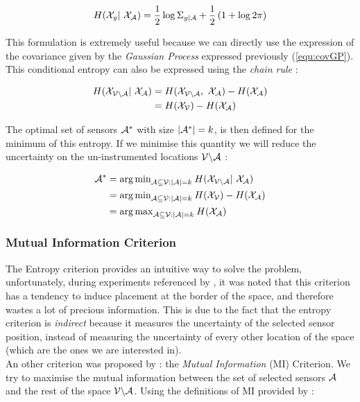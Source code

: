\documentclass[12pt,twoside]{report}
\begin{document}
\begin{equation}
	H(\X_{y} | \X_\A) = \frac{1}{2} \log \Sigma_{y | \A} + \frac{1}{2} \left(1 + \log 2\pi  \right) \label{equ:entGP}
\end{equation}

This formulation is extremely useful because we can directly use the expression of the covariance given by the \textit{Gaussian Process} expressed previously (\ref{equ:covGP}). \\


This conditional entropy can also be expressed using the \textit{chain rule}  \citep[p.~16]{cover_elements_1991} : 

\begin{align}
	H(\X_{\VA} | \X_\A) &= H(\X_{\VA} ,  \X_\A) -  H(\X_{\A}) \\
	&= H(\X_{\V}) -  H(\X_{\A}) 
\label{equ:chainentropy}
\end{align}

The optimal set of sensors $\mathcal{A}^*$ with size $|\mathcal{A}^*| = k$, is then defined for the minimum of this entropy. If we minimise this quantity we will reduce the uncertainty on the un-instrumented locations $\mathcal{V} \backslash\mathcal{A}$ : 

\begin{align}
	\A^* &= {\arg\min}_{\A \subseteq \V : |\A| = k } \: H(\X_{\VA} | \X_\A) \\
	 &= {\arg\min}_{\A \subseteq \V : |\A| = k }\:  H(\X_\V) -  H(\X_{\A}) \\
	 &= {\arg\max}_{\A \subseteq \V : |\A| = k }\:  H(\X_{\A}) 
\end{align}


\subsubsection{Mutual Information Criterion}

The Entropy criterion provides an intuitive way to solve the problem, unfortunately, during experiments referenced by \citet{krause_near-optimal_2008}, it was noted that this criterion has a tendency to induce placement at the border of the space, and therefore wastes a lot of precious information. This is due to the fact that the entropy criterion is \textit{indirect} because it measures the uncertainty of the selected sensor position, instead of measuring the uncertainty of every other location of the space (which are the ones we are interested in). \\

An other criterion was proposed by \citet{caselton_optimal_1984} : the \textit{Mutual Information} (MI) Criterion. We try to maximise the mutual information between the set of selected sensors $\mathcal{A}$ and the rest of the space $\mathcal{V} \backslash\mathcal{A}$. Using the definitions of MI provided by \citet[p.~19]{cover_elements_1991} : 
\end{document}
